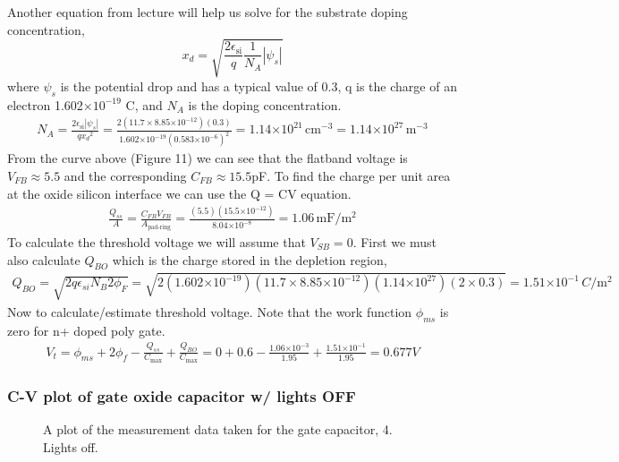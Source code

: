 \documentclass{article}
\providecommand{\e}[1]{\ensuremath{\times 10^{#1}}}
\begin{document}
Another equation from lecture will help us solve for the substrate doping concentration,
\begin{equation}
x_d = \sqrt{\frac{2\epsilon_{\text{si}}}{q}\frac{1}{N_A}|\psi_s|}
\end{equation}
where $\psi_s$ is the potential drop and has a typical value of 0.3, q is the charge of an electron 1.602\e{-19} C, and $N_A$ is the doping concentration.
\begin{align*}
N_A = \frac{2\epsilon_{\text{si}} |\psi_s|}{q{x_d}^2} = \frac{2(11.7 \times 8.85\e{-12})(0.3)}{1.602\e{-19}(0.583\e{-6})^2} = 1.14\e{21} \,{\text{cm}}^{-3} = 1.14\e{27} \,{\text{m}}^{-3}
\end{align*}
From the curve above (Figure 11) we can see that the flatband voltage is $V_{FB} \approx 5.5$ and the corresponding $C_{FB} \approx 15.5$pF. To find the charge per unit area at the oxide silicon interface we can use the Q = CV equation.
\begin{align*}
\frac{Q_{ss}}{A} = \frac{C_{FB}V_{FB}}{A_{\text{pad-ring}}} = \frac{(5.5)(15.5\e{-12})}{8.04\e{-8}} = 1.06 \,\text{mF}/\text{m}^2
\end{align*}
To calculate the threshold voltage we will assume that $V_{SB} = 0$. First we must also calculate $Q_{BO}$ which is the charge stored in the depletion region,
\begin{align*}
Q_{BO} = \sqrt{2q\epsilon_{si}N_B2\phi_F} = \sqrt{2(1.602\e{-19})(11.7 \times 8.85\e{-12})(1.14\e{27})(2 \times 0.3)} = 1.51\e{-1}\, C/{\text{m}}^2
\end{align*}
Now to calculate/estimate threshold voltage. Note that the work function $\phi_{ms}$ is zero for n+ doped poly gate.
\begin{align*}
V_t = \phi_{ms} + 2\phi_f - \frac{Q_{ss}}{C_{\text{max}}} + \frac{Q_{BO}}{C_{\text{max}}} = 0 + 0.6 - \frac{1.06\e{-3}}{1.95} + \frac{1.51\e{-1}}{1.95} = 0.677 V
\end{align*}

\subsubsection{C-V plot of gate oxide capacitor w/ lights OFF}
\begin{figure}[H]
\centering
{}
\caption{A plot of the measurement data taken for the gate capacitor, 4. Lights off.}
\end{figure}
\end{document}
